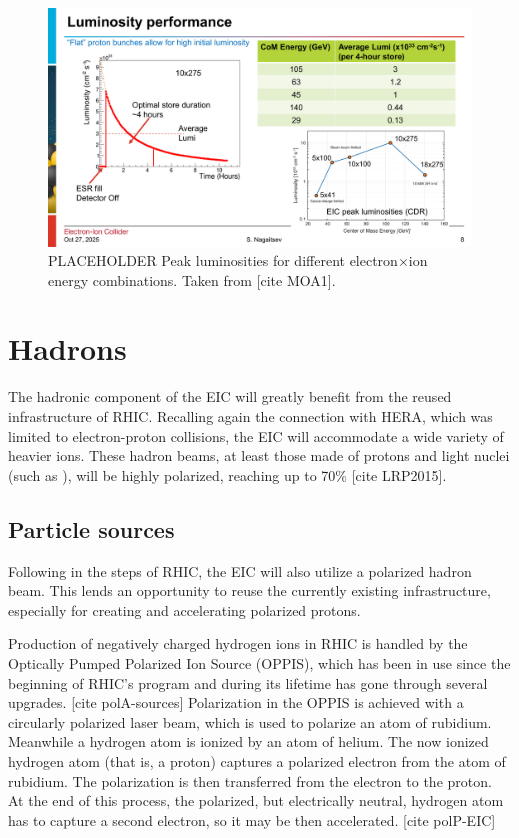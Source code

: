\begin{figure}[ht]
    \centering
    \includegraphics[width=.85\linewidth]{img/luminosity2_placeholder.pdf}
    \caption{PLACEHOLDER Peak luminosities for different electron$\times$ion energy combinations. Taken from [cite MOA1].} %
    \label{fig:eic:lumi}
\end{figure}


\section{Hadrons}
The hadronic component of the EIC will greatly benefit from the reused infrastructure of RHIC. Recalling again the connection with HERA, which was limited to electron-proton collisions, the EIC will accommodate a wide variety of heavier ions. These hadron beams, at least those made of protons and light nuclei (such as ), will be highly polarized, reaching up to 70\% [cite LRP2015].

\subsection{Particle sources}
Following in the steps of RHIC, the EIC will also utilize a polarized hadron beam. This lends an opportunity to reuse the currently existing infrastructure, especially for creating and accelerating polarized protons. 

Production of negatively charged hydrogen ions in RHIC is handled by the Optically Pumped Polarized Ion Source (OPPIS), which has been in use since the beginning of RHIC's program and during its lifetime has gone through several upgrades. [cite polA-sources] Polarization in the OPPIS is achieved with a circularly polarized laser beam, which is used to polarize an atom of rubidium. Meanwhile a hydrogen atom is ionized by an atom of helium. The now ionized hydrogen atom (that is, a proton) captures a polarized electron from the atom of rubidium. The polarization is then transferred from the electron to the proton. At the end of this process, the polarized, but electrically neutral, hydrogen atom has to capture a second electron, so it may be then accelerated. [cite polP-EIC]


